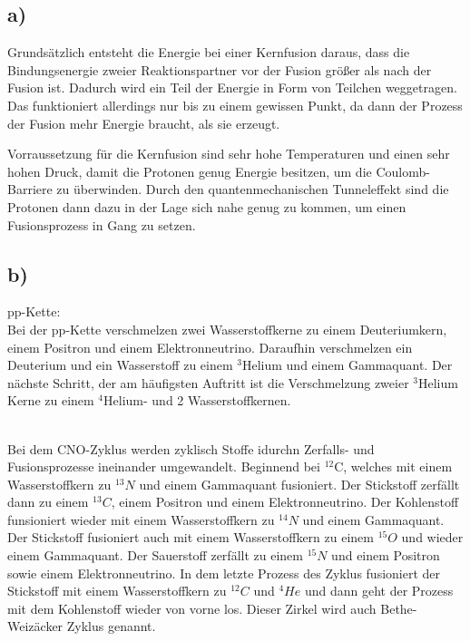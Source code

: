 \newpage
\subsection{a)}

Grundsätzlich entsteht die Energie bei einer Kernfusion daraus, dass die Bindungsenergie zweier
Reaktionspartner vor der Fusion größer als nach der Fusion ist. Dadurch wird ein Teil der Energie
in Form von Teilchen weggetragen. Das funktioniert allerdings nur bis zu einem gewissen Punkt,
da dann der Prozess der Fusion mehr Energie braucht, als sie erzeugt.

\justifying Vorraussetzung für die Kernfusion sind sehr hohe Temperaturen und einen sehr hohen Druck, damit die Protonen genug Energie besitzen,
um die Coulomb-Barriere zu überwinden. Durch den quantenmechanischen Tunneleffekt sind die Protonen 
dann dazu in der Lage sich nahe genug zu kommen, um einen Fusionsprozess in Gang zu setzen. 


\subsection{b)}

pp-Kette:\\
Bei der pp-Kette verschmelzen zwei Wasserstoffkerne zu einem Deuteriumkern, einem Positron und einem Elektronneutrino.
Daraufhin verschmelzen ein Deuterium und ein Wasserstoff zu einem $^3$Helium und einem Gammaquant.
Der nächste Schritt, der am häufigsten Auftritt ist die Verschmelzung zweier $^3$Helium Kerne zu
einem $^4$Helium- und 2 Wasserstoffkernen.


\justifying\\
Bei dem CNO-Zyklus werden zyklisch Stoffe idurchn Zerfalls- und Fusionsprozesse ineinander umgewandelt.
Beginnend bei $^{12}$C, welches mit einem Wasserstoffkern zu $^{13}N $ und einem Gammaquant fusioniert. 
Der Stickstoff zerfällt dann zu einem $^{13} C$, einem Positron und einem Elektronneutrino.
Der Kohlenstoff funsioniert wieder mit einem Wasserstoffkern zu $^{14}N $ und einem Gammaquant.
Der Stickstoff fusioniert auch mit einem Wasserstoffkern zu einem $^{15}O $ und wieder einem Gammaquant.
Der Sauerstoff zerfällt zu einem $^{15}N $ und einem Positron sowie einem Elektronneutrino.
In dem letzte Prozess des Zyklus fusioniert der Stickstoff mit einem Wasserstoffkern zu $^{12}C$ und $^4He$
und dann geht der Prozess mit dem Kohlenstoff wieder von vorne los. Dieser Zirkel wird auch Bethe-Weizäcker Zyklus genannt.

